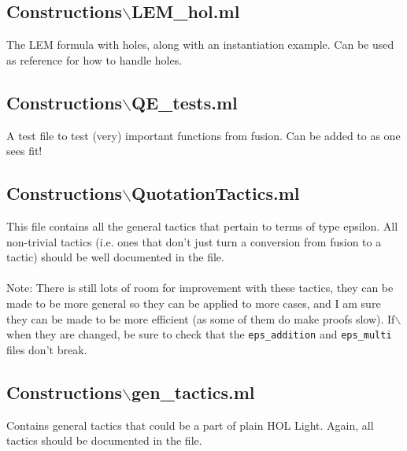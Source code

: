 \documentclass{article}
\def\c#1{\texttt{#1}}
\begin{document}
\subsection{Constructions$\backslash$LEM\_hol.ml}
The LEM formula with holes, along with an instantiation example. Can be used as reference for how to handle holes.

\subsection{Constructions$\backslash$QE\_tests.ml}
A test file to test (very) important functions from fusion. Can be added to as one sees fit!

\subsection{Constructions$\backslash$QuotationTactics.ml}
This file contains all the general tactics that pertain to terms of type epsilon. All non-trivial tactics (i.e. ones that don't just turn a conversion from fusion to a tactic) should be well documented in the file.
\\
\\
Note: There is still lots of room for improvement with these tactics, they can be made to be more general so they can be applied to more cases, and I am sure they can be made to be more efficient (as some of them do make proofs slow). If$\backslash$ when they are changed, be sure to check that the \c{eps\_addition} and \c{eps\_multi} files don't break.

\subsection{Constructions$\backslash$gen\_tactics.ml}
Contains general tactics that could be a part of plain HOL Light. Again, all tactics should be documented in the file.
\end{document}
